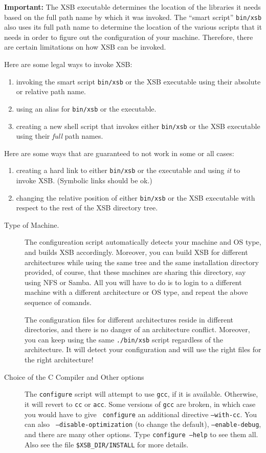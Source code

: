{\bf Important:} The XSB executable determines the location of the
libraries it needs based on the full path name by which it was invoked.
The ``smart script'' \verb|bin/xsb| also uses its full path name to
determine the location of the various scripts that it needs in order to
figure out the configuration of your machine.  Therefore, there are certain
limitations on how XSB can be invoked.

Here are some legal ways to invoke XSB:
\begin{enumerate}
\item  invoking the smart script \verb|bin/xsb| or the XSB executable using
  their absolute or relative path name.
\item using an alias for \verb|bin/xsb| or the executable.
\item creating a new shell script that invokes either \verb|bin/xsb| or the
  XSB executable using their {\em full\/} path names. 
\end{enumerate}

Here are some ways that are guaranteed to not work in some or all cases:
\begin{enumerate}
\item  creating a hard link to either \verb|bin/xsb| or the executable and
  using {\it it\/} to invoke XSB. (Symbolic links should be ok.)
\item changing the relative position of either \verb|bin/xsb| or the
  XSB executable with respect to the rest of the XSB directory tree.
\end{enumerate}

\begin{description}
\item[Type of Machine.]  The configureation script automatically detects
  your machine and OS type, and builds XSB accordingly. Moreover, you can
  build XSB for different architectures while using the same tree and the
  same installation directory provided, of course, that these machines are
  sharing this directory, say using NFS or Samba. All you will have to do
  is to login to a different machine with a different architecture or OS
  type, and repeat the above sequence of comands.
  
  The configuration files for different architectures reside in different
  directories, and there is no danger of an architecture conflict.
  Moreover, you can keep using the same {\tt ./bin/xsb} script regardless
  of the architecture. It will detect your configuration and will use the
  right files for the right architecture! 
  
\item[Choice of the C Compiler and Other options] \label{cc}
  The {\tt configure} script will attempt to use {\tt gcc}, if it is available.
  Otherwise, it will revert to {\tt cc} or {\tt acc}.  Some versions of
  {\tt gcc} are broken, in which case you would have to give {\tt
    configure} an additional directive {\tt --with-cc}.  You can also {\tt
    --disable-optimization} (to change the default), {\tt --enable-debug},
  and there are many other options.  Type {\tt configure --help} to see
  them all. Also see the file \verb'$XSB_DIR/INSTALL' for more details.
\end{description}


